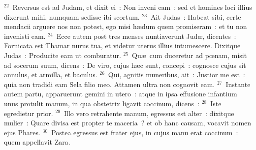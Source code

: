 ${}^{22}$~Reversus est ad Judam, et dixit ei~: Non inveni eam~: sed et homines loci illius dixerunt mihi, numquam sedisse ibi scortum.
${}^{23}$~Ait Judas~: Habeat sibi, certe mendacii arguere nos non potest, ego misi h\ae dum quem promiseram~: et tu non invenisti eam.
${}^{24}$~Ecce autem post tres menses nuntiaverunt Jud\ae , dicentes~: Fornicata est Thamar nurus tua, et videtur uterus illius intumescere. Dixitque Judas~: Producite eam ut comburatur.
${}^{25}$~Qu\ae\ cum duceretur ad pœnam, misit ad socerum suum, dicens~: De viro, cujus h\ae c sunt, concepi~: cognosce cujus sit annulus, et armilla, et baculus.
${}^{26}$~Qui, agnitis muneribus, ait~: Justior me est~: quia non tradidi eam Sela filio meo. Attamen ultra non cognovit eam.
${}^{27}$~Instante autem partu, apparuerunt gemini in utero~: atque in ipsa effusione infantium unus protulit manum, in qua obstetrix ligavit coccinum, dicens~:
${}^{28}$~Iste egredietur prior.
${}^{29}$~Illo vero retrahente manum, egressus est alter~: dixitque mulier~: Quare divisa est propter te maceria~? et ob hanc causam, vocavit nomen ejus Phares.
${}^{30}$~Postea egressus est frater ejus, in cujus manu erat coccinum~: quem appellavit Zara.

